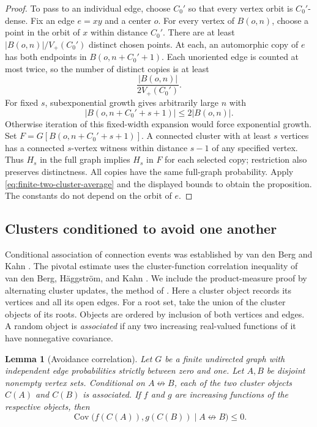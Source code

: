 \documentclass[11pt]{article}
\newtheorem{lemma}[theorem]{Lemma}
\theoremstyle{definition}
\DeclareMathOperator{\Cov}{Cov}
\begin{document}
\begin{proof}
To pass to an individual edge, choose $C_0'$ so that every vertex orbit
is $C_0'$-dense. Fix an edge $e=xy$ and a center $o$. For every vertex
of $B(o,n)$, choose a point in the orbit of $x$ within distance $C_0'$.
There are at least $|B(o,n)|/V_+(C_0')$ distinct chosen points. At each,
an automorphic copy of $e$ has both endpoints in $B(o,n+C_0'+1)$.
Each unoriented edge is counted at most twice, so the number of distinct
copies is at least
\[
 \frac{|B(o,n)|}{2V_+(C_0')}.
\]
For fixed $s$, subexponential growth gives arbitrarily large $n$ with
\[
 |B(o,n+C_0'+s+1)|\le2|B(o,n)|.
\]
Otherwise iteration of this fixed-width expansion would force
exponential growth. Set $F=G[B(o,n+C_0'+s+1)]$. A connected cluster
with at least $s$ vertices has a connected $s$-vertex witness within
distance $s-1$ of any specified vertex. Thus $H_s$ in the full graph
implies $H_s$ in $F$ for each selected copy; restriction also preserves
distinctness. All copies have the same full-graph probability.
Apply \eqref{eq:finite-two-cluster-average} and the displayed bounds
to obtain the proposition. The constants do not depend on the orbit
of $e$.
\end{proof}

\subsection{Clusters conditioned to avoid one another}

Conditional association of connection events was established by
van den Berg and Kahn \cite{VanDenBergKahn2001}.
The pivotal estimate uses the cluster-function correlation inequality of
van den Berg, H\"aggstr\"om, and Kahn
\cite[Theorems~1.3 and~1.4]{VanDenBergHaggstromKahn2006}. We include the
product-measure proof by alternating cluster updates, the method of
\cite[Section~2.1]{VanDenBergHaggstromKahn2006}.
Here a cluster object records its vertices and all its open edges.
For a root set, take the union of the cluster objects of its roots.
Objects are ordered by inclusion of both vertices and edges.
A random object is \emph{associated} if any two increasing real-valued
functions of it have nonnegative covariance.

\begin{lemma}[Avoidance correlation]\label{lem:avoidance}
Let $G$ be a finite undirected graph with independent edge probabilities
strictly between zero and one. Let $A,B$ be disjoint nonempty vertex
sets. Conditional on $A\not\leftrightarrow B$, each of the two cluster
objects $C(A)$ and $C(B)$ is associated. If $f$ and $g$ are increasing
functions of the respective objects, then
\[
 \Cov\bigl(f(C(A)),g(C(B))\mid A\not\leftrightarrow B\bigr)\le0.
\]
\end{lemma}
\end{document}
